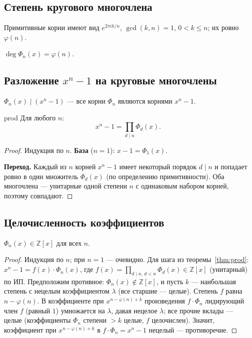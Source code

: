 \subsection{Степень кругового многочлена}

Примитивные корни имеют вид $e^{2\pi i k/n}$, $\gcd(k,n)=1$, $0<k\le n$; их ровно $\varphi(n)$.

\begin{Statement}{}{}
	$\deg\Phi_n(x)=\varphi(n)$.
\end{Statement}

\subsection{Разложение $x^n-1$ на круговые многочлены}

\begin{Statement}{}{}
	$\Phi_n(x)\mid(x^n-1)$ — все корни $\Phi_n$ являются корнями $x^n-1$.
\end{Statement}

\begin{Theorem}{}{prod}
	Для любого $n$:
	\[
	x^n-1=\prod_{d\mid n}\Phi_d(x).
	\]
\end{Theorem}

\begin{proof}
	Индукция по $n$. \textbf{База} ($n=1$): $x-1=\Phi_1(x)$.

	\textbf{Переход.} Каждый из $n$ корней $x^n-1$ имеет некоторый порядок $d\mid n$ и попадает ровно в один множитель $\Phi_d(x)$ (по определению примитивности). Оба многочлена — унитарные одной степени $n$ с одинаковым набором корней, поэтому совпадают.
\end{proof}

\subsection{Целочисленность коэффициентов}

\begin{Theorem}{}{}
	$\Phi_n(x)\in\mathbb Z[x]$ для всех $n$.
\end{Theorem}

\begin{proof}
	Индукция по $n$; при $n=1$ — очевидно. Для шага из теоремы~\ref{thm:prod}: $x^n-1=f(x)\cdot\Phi_n(x)$, где $f(x)=\prod_{d\mid n,\,d<n}\Phi_d(x)\in\mathbb Z[x]$ (унитарный) по ИП. Предположим противное: $\Phi_n(x)\notin\mathbb Z[x]$, и пусть $k$ — наибольшая степень с нецелым коэффициентом $\lambda$ (все старшие — целые). Степень $f$ равна $n-\varphi(n)$. В коэффициенте при $x^{n-\varphi(n)+k}$ произведения $f\cdot\Phi_n$ лидирующий член $f$ (равный $1$) умножается на $\lambda$, давая нецелое $\lambda$; все прочие вклады — целые (коэффициенты $\Phi_n$ степени $>k$ целые, $f$ целочислен). Значит, коэффициент при $x^{n-\varphi(n)+k}$ в $f\cdot\Phi_n=x^n-1$ нецелый — противоречие.
\end{proof}

